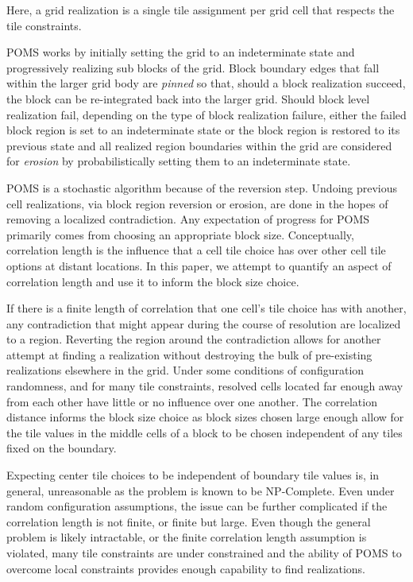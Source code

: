 Here, a grid realization is a single tile assignment per grid cell that respects the
tile constraints.

POMS works by initially setting the grid to an indeterminate state and progressively realizing
sub blocks of the grid.
Block boundary edges that fall within the larger grid body are \textit{pinned} so that, should a
block realization succeed, the block can be re-integrated back into the larger grid.
Should block level realization fail, depending on the type of block realization failure,
either the failed block region is set to an indeterminate state
or the block region is restored to its previous state and all realized region boundaries within the grid
are considered for \textit{erosion} by probabilistically
setting them to an indeterminate state.

POMS is a stochastic algorithm because of the reversion step.
Undoing previous cell realizations, via
block region reversion or erosion, are done in the hopes of
removing a localized contradiction.
Any expectation of progress for POMS primarily comes from choosing an
appropriate block size.
Conceptually, correlation length is the influence that a cell tile choice
has over other cell tile options at distant locations.
In this paper, we attempt to quantify an aspect of correlation length and use it
to inform the block size choice.

If there is a finite length of correlation that one cell's tile choice has with another,
any contradiction that might appear during the course of resolution are localized to a region.
Reverting the region around the contradiction allows for another attempt at finding a
realization without destroying
the bulk of pre-existing realizations elsewhere in the grid.
Under some conditions of configuration randomness, and for many tile constraints,
resolved cells located far enough away from each other have little or no influence over one another.
The correlation distance informs the block size choice as block sizes chosen large enough allow
for the tile values in the middle cells of a block to be chosen independent of any tiles fixed on the boundary.

Expecting center tile choices to be independent of boundary tile values is, in general, unreasonable as
the problem is known to be NP-Complete.
Even under random configuration assumptions, the issue can be further complicated if the correlation length is not
finite, or finite but large.
Even though the general problem is likely intractable, or the finite correlation length assumption is
violated, many tile constraints are under constrained and the ability of POMS to overcome local constraints
provides enough capability to find realizations.

